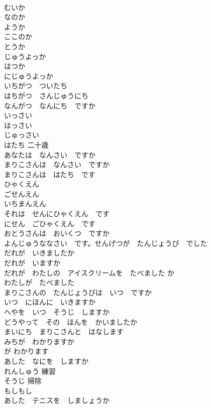 \documentclass[8pt]{extreport}
\begin{document}
\begin{CJK}{UTF8}{min}
\\	むいか	
\\	なのか	
\\	ようか	
\\	ここのか	
\\	とうか	
\\	じゅうよっか	
\\	はつか	
\\	にじゅうよっか	
\\	いちがつ　ついたち	
\\	はちがつ　さんじゅうにち	
\\	なんがつ　なんにち　ですか	
\\	いっさい	
\\	はっさい	
\\	じゅっさい	
\\	はたち	二十歳
\\	あなたは　なんさい　ですか	
\\	まりこさんは　なんさい　ですか	
\\	まりこさんは　はたち　です	
\\	ひゃくえん	
\\	ごせんえん	
\\	いちまんえん	
\\	それは　せんにひゃくえん　です	
\\	にせん　ごひゃくえん　です	
\\	おとうさんは　おいくつ　ですか	
\\	よんじゅうななさい　です。せんげつが　たんじょうび　でした	
\\	だれが　いきましたか	
\\	だれが　いますか	
\\	だれが　わたしの　アイスクリームを　たべました か	
\\	わたしが　たべました	
\\	まりこさんの　たんじょうびは　いつ　ですか	
\\	いつ　にほんに　いきますか	
\\	へやを　いつ　そうじ　しますか	
\\	どうやって　その　ほんを　かいましたか	
\\	まいにち　まりこさんと　はなします	
\\	みちが　わかりますか	
\\	が わかります
\\	あした　なにを　しますか	
\\	れんしゅう	練習
\\	そうじ	掃除
\\	もしもし	
\\	あした　テニスを　しましょうか	

\end{CJK}
\end{document}
